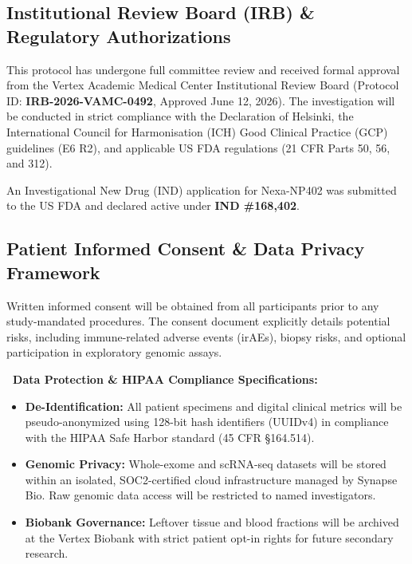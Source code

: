 \documentclass[10pt,a4paper]{article}
\begin{document}
\subsection{Institutional Review Board (IRB) \& Regulatory Authorizations}
This protocol has undergone full committee review and received formal approval from the Vertex Academic Medical Center Institutional Review Board (Protocol ID: \textbf{IRB-2026-VAMC-0492}, Approved June 12, 2026). The investigation will be conducted in strict compliance with the Declaration of Helsinki, the International Council for Harmonisation (ICH) Good Clinical Practice (GCP) guidelines (E6 R2), and applicable US FDA regulations (21 CFR Parts 50, 56, and 312).

An Investigational New Drug (IND) application for Nexa-NP402 was submitted to the US FDA and declared active under \textbf{IND \#168,402}.

\subsection{Patient Informed Consent \& Data Privacy Framework}
Written informed consent will be obtained from all participants prior to any study-mandated procedures. The consent document explicitly details potential risks, including immune-related adverse events (irAEs), biopsy risks, and optional participation in exploratory genomic assays.

\begin{tcolorbox}[ethicalbox]
\textbf{\color{PrimaryNavy}\faLock\ Data Protection \& HIPAA Compliance Specifications:}
\begin{itemize}[leftmargin=1.5em, topsep=1pt, itemsep=1.5pt]
  \item \textbf{De-Identification:} All patient specimens and digital clinical metrics will be pseudo-anonymized using 128-bit hash identifiers (UUIDv4) in compliance with the HIPAA Safe Harbor standard (45 CFR \S 164.514).
  \item \textbf{Genomic Privacy:} Whole-exome and scRNA-seq datasets will be stored within an isolated, SOC2-certified cloud infrastructure managed by Synapse Bio. Raw genomic data access will be restricted to named investigators.
  \item \textbf{Biobank Governance:} Leftover tissue and blood fractions will be archived at the Vertex Biobank with strict patient opt-in rights for future secondary research.
\end{itemize}
\end{tcolorbox}
\end{document}
